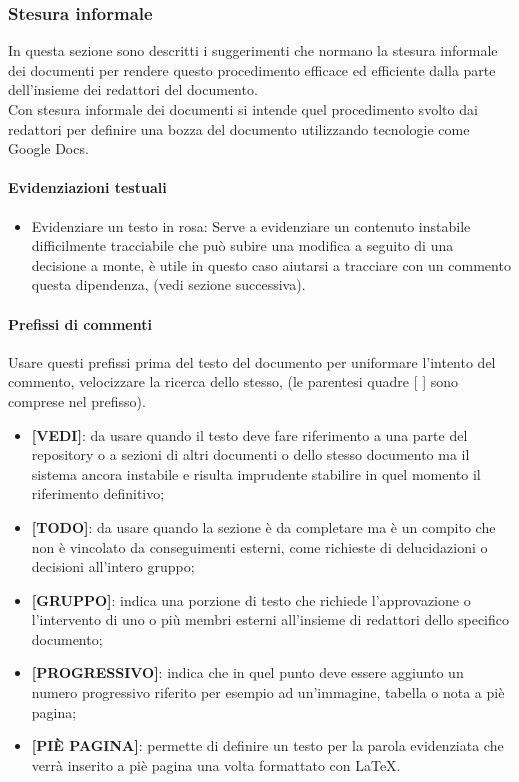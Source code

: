		\subsubsection{Stesura informale}
			In questa sezione sono descritti i suggerimenti che normano la stesura informale dei documenti per rendere questo procedimento efficace ed efficiente dalla parte dell’insieme dei redattori del documento.\\
			Con stesura informale dei documenti si intende quel procedimento svolto dai redattori per definire una bozza del documento utilizzando tecnologie come Google Docs.
			\paragraph{Evidenziazioni testuali}
				\begin{itemize}
					\item\colorbox{bubblegum}{Evidenziare un testo in rosa}: Serve a evidenziare un contenuto instabile difficilmente tracciabile che può subire una modifica a seguito di una decisione a monte, è utile in questo caso aiutarsi a tracciare con un commento questa dipendenza, (vedi sezione successiva).\\
				\end{itemize}
			\paragraph{Prefissi di commenti}
				Usare questi prefissi prima del testo del documento per uniformare l’intento del commento, velocizzare la ricerca dello stesso, (le parentesi quadre {[ ]} sono comprese nel prefisso).\\
				\begin{itemize}
					\item\textbf{[VEDI]}: da usare quando il testo deve fare riferimento a una parte del repository o a sezioni di altri documenti o dello stesso documento ma il sistema ancora instabile e risulta imprudente stabilire in quel momento il riferimento definitivo; \\
					\item\textbf{[TODO]}: da usare quando la sezione è da completare ma è un compito che non è vincolato da conseguimenti esterni, come richieste di delucidazioni o decisioni all’intero gruppo; \\
					\item\textbf{[GRUPPO]}: indica una porzione di testo che richiede l’approvazione o l’intervento di uno o più membri esterni all’insieme di redattori dello specifico documento;\\
					\item\textbf{[PROGRESSIVO]}: indica che in quel punto deve essere aggiunto un numero progressivo riferito per esempio ad un’immagine, tabella o nota a piè pagina; \\
					\item\textbf{[PIÈ PAGINA]}: permette di definire un testo per la parola evidenziata che verrà inserito a piè pagina una volta formattato con LaTeX.
				\end{itemize}

